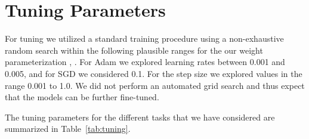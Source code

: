 \documentclass{article} \usepackage{iclr2021_conference,times}
\begin{document}
\begin{table}[!h]
	\caption{Evaluation accuracy on PTB for word-level prediction. The * indicate results adopted from \citet{kusupati2018fastgrnn}. Note that here the parameters for the hidden-to-hidden units are reported.}
	\label{tab:PTB_word}
	\centering
\end{table}





\section{Tuning Parameters}

For tuning we utilized a standard training procedure using a non-exhaustive random search within the following plausible ranges for the our weight parameterization , . For Adam we explored learning rates between 0.001 and 0.005, and for SGD we considered 0.1. For the step size we explored values in the range 0.001 to 1.0. We did not perform an automated grid search and thus expect that the models can be further fine-tuned.

The tuning parameters for the different tasks that we have considered are summarized in Table~\ref{tab:tuning}. 
\end{document}
